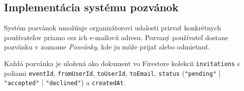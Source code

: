  \subsection{Implementácia systému pozvánok}                                                                                                                                                                                      

  Systém pozvánok umožňuje organizátorovi udalosti prizvať konkrétnych
  používateľov priamo cez ich e-mailovú adresu. Pozvaný používateľ dostane
  pozvánku v zozname \textit{Pozvánky}, kde ju môže prijať alebo odmietnuť.

  Každá pozvánka je uložená ako dokument vo Firestore kolekcii
  \texttt{invitations} s poliami \texttt{eventId}, \texttt{fromUserId},
  \texttt{toUserId}, \texttt{toEmail}, \texttt{status}
  (\texttt{"pending"} | \texttt{"accepted"} | \texttt{"declined"})
  a \texttt{createdAt}.

